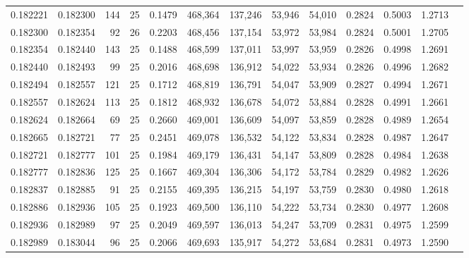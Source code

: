 \begin{tabular}{rrrrrrrrrrrrr}
0.182221 & 0.182300 &   144 &  25 &                                     0.1479 & 468,364 & 137,246 &  53,946 &  54,010 & 0.2824 & 0.5003 & 1.2713 \\
0.182300 & 0.182354 &    92 &  26 &                                     0.2203 & 468,456 & 137,154 &  53,972 &  53,984 & 0.2824 & 0.5001 & 1.2705 \\
0.182354 & 0.182440 &   143 &  25 &                                     0.1488 & 468,599 & 137,011 &  53,997 &  53,959 & 0.2826 & 0.4998 & 1.2691 \\
0.182440 & 0.182493 &    99 &  25 &                                     0.2016 & 468,698 & 136,912 &  54,022 &  53,934 & 0.2826 & 0.4996 & 1.2682 \\
0.182494 & 0.182557 &   121 &  25 &                                     0.1712 & 468,819 & 136,791 &  54,047 &  53,909 & 0.2827 & 0.4994 & 1.2671 \\
0.182557 & 0.182624 &   113 &  25 &                                     0.1812 & 468,932 & 136,678 &  54,072 &  53,884 & 0.2828 & 0.4991 & 1.2661 \\
0.182624 & 0.182664 &    69 &  25 &                                     0.2660 & 469,001 & 136,609 &  54,097 &  53,859 & 0.2828 & 0.4989 & 1.2654 \\
0.182665 & 0.182721 &    77 &  25 &                                     0.2451 & 469,078 & 136,532 &  54,122 &  53,834 & 0.2828 & 0.4987 & 1.2647 \\
0.182721 & 0.182777 &   101 &  25 &                                     0.1984 & 469,179 & 136,431 &  54,147 &  53,809 & 0.2828 & 0.4984 & 1.2638 \\
0.182777 & 0.182836 &   125 &  25 &                                     0.1667 & 469,304 & 136,306 &  54,172 &  53,784 & 0.2829 & 0.4982 & 1.2626 \\
0.182837 & 0.182885 &    91 &  25 &                                     0.2155 & 469,395 & 136,215 &  54,197 &  53,759 & 0.2830 & 0.4980 & 1.2618 \\
0.182886 & 0.182936 &   105 &  25 &                                     0.1923 & 469,500 & 136,110 &  54,222 &  53,734 & 0.2830 & 0.4977 & 1.2608 \\
0.182936 & 0.182989 &    97 &  25 &                                     0.2049 & 469,597 & 136,013 &  54,247 &  53,709 & 0.2831 & 0.4975 & 1.2599 \\
0.182989 & 0.183044 &    96 &  25 &                                     0.2066 & 469,693 & 135,917 &  54,272 &  53,684 & 0.2831 & 0.4973 & 1.2590 \\

\end{tabular}
